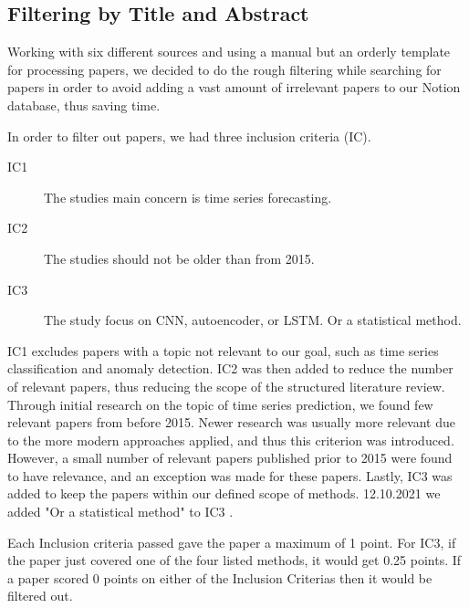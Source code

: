 \subsection{Filtering by Title and Abstract}
Working with six different sources and using a manual but an orderly template for processing papers,
we decided to do the rough filtering while searching for papers in order to avoid adding a vast amount of irrelevant
papers to our Notion database, thus saving time.

In order to filter out papers, we had three inclusion criteria (IC).
\begin{description}
    \item[IC1] The studies main concern is time series forecasting.
    \item[IC2] The studies should not be older than from 2015.
    \item[IC3] The study focus on CNN, autoencoder, or LSTM. Or a statistical method.
\end{description}
IC1 excludes papers with a topic not relevant to our goal, such as time series classification and anomaly detection.
IC2 was then added to reduce the number of relevant papers, thus reducing the scope of the structured literature review.
Through initial research on the topic of time series prediction, we found few relevant papers from before 2015.
Newer research was usually more relevant due to the more modern approaches applied, and thus this criterion was introduced.
However, a small number of relevant papers published prior to 2015 were found to have relevance, and an exception was made for these papers.
Lastly, IC3 was added to keep the papers within our defined scope of methods. 12.10.2021 we added "Or a statistical method"
to IC3 \citep{decisionmatrix}.

Each Inclusion criteria passed gave the paper a maximum of 1 point. For IC3, if the paper just covered one of the
four listed methods, it would get 0.25 points. If a paper scored 0 points on either of the Inclusion Criterias then
it would be filtered out.

